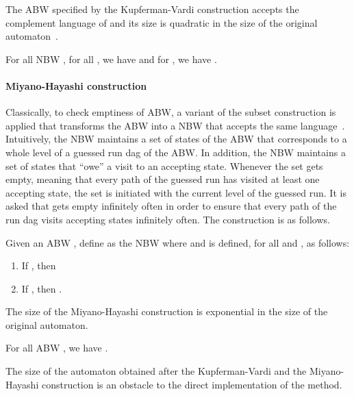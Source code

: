\documentclass{LMCS}
\newcommand{\DAG}{{\sc dag}}
\begin{document}
The ABW specified by the Kupferman-Vardi construction accepts the
complement language of  and its size is quadratic in the size of the
original automaton~.

\begin{thm}\label{theo:complement}
For all NBW , for all , we have  and 
for , we have .
\end{thm}



\paragraph{{\bf Miyano-Hayashi construction}}
Classically, to check emptiness of ABW, a variant 
of the subset construction is applied that transforms the ABW into a NBW 
that accepts the same language~\cite{MiyanoH84}. Intuitively, the NBW 
maintains a set  of states of the ABW that corresponds to a whole
level of a guessed run \DAG\/ of the ABW. In addition, the NBW maintains
a set  of states that ``owe'' a visit to an accepting state. Whenever
the set  gets empty, meaning that every path of the guessed run has visited
at least one accepting state, the set  is initiated with the current
level of the guessed run. It is asked that  gets empty infinitely often
in order to ensure that every path of the run \DAG\/ visits accepting states
infinitely often. The construction is as follows.

\begin{defi}\label{def:MH-construction}
Given an ABW , define  as the NBW  where
 and  is defined,
for all  and , as follows:

\begin{enumerate}[] 

\item If , then


\item If , then .
\end{enumerate} 

\end{defi}

The size of the Miyano-Hayashi construction is exponential in the 
size of the original automaton. 

\begin{thm}\label{theo:subset-construction}
For all ABW , we have .
\end{thm}

The size of the automaton obtained after the Kupferman-Vardi
and the Miyano-Hayashi construction is an obstacle to the
direct implementation of the method.  
\end{document}
